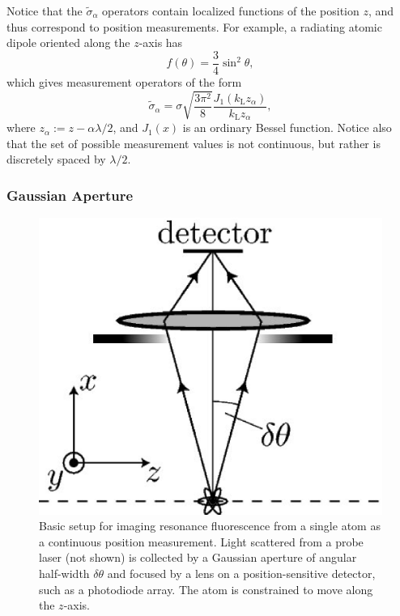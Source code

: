 \documentclass[aps,twocolumn,superscriptaddress,footinbib,floatfix,showpacs]{revtex4}
\def\kL{k_\mathrm{\scriptscriptstyle L}}
\begin{document}
Notice that the $\tilde\sigma_\alpha$ operators
contain localized functions of the position $z$, and thus correspond
to position measurements.
For example, a radiating atomic dipole oriented along the $z$-axis
has
\begin{equation}
  f(\theta) = \frac{3}{4}\sin^2\theta,
  \label{ftheta}
\end{equation}
which gives measurement operators of the form
\begin{equation}
  \tilde \sigma_{\alpha} = \sigma
    \sqrt{\frac{3\pi^2}{8}}
      \frac{J_1(\kL z_\alpha)}{\kL z_\alpha},
\end{equation}
where $z_\alpha := z-\alpha\lambda/2$, and $J_1(x)$ is an ordinary
Bessel function.
Notice also that the set of possible measurement values is not 
continuous, but rather is discretely spaced by $\lambda/2$.


\subsubsection{Gaussian Aperture}

\begin{figure}[tb]
  \begin{center}
    \includegraphics[width=0.5\hsize]{imagingsetup.bmap.300.eps}
  \end{center}
  \vspace{-5mm}
  \caption
        {Basic setup for imaging resonance fluorescence from
         a single atom as a continuous position measurement.
         Light scattered from a probe laser (not shown)
         is collected by a Gaussian aperture of angular half-width
         $\delta \theta$ and focused by a lens on a position-sensitive
         detector, such as a photodiode array.  The atom is
         constrained to move along the $z$-axis.
	\label{fig:imaging}}
\end{figure}
\end{document}
